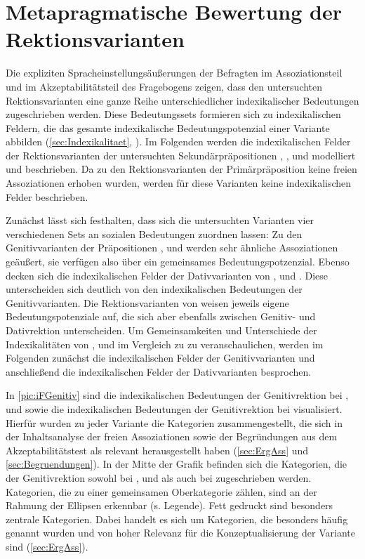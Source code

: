 \section{Metapragmatische Bewertung der Rektionsvarianten}
\label{sec:DiskBewertung}
Die expliziten Spracheinstellungsäußerungen der Befragten im Assoziationsteil und im Akzeptabilitätsteil des Fragebogens zeigen, dass den untersuchten Rektionsvarianten eine ganze Reihe unterschiedlicher indexikalischer Bedeutungen zugeschrieben werden. 
Diese Bedeutungssets formieren sich zu indexikalischen Feldern, die das gesamte indexikalische Bedeutungspotenzial einer Variante abbilden (\autoref{sec:Indexikalitaet}, \citealp[s.][]{Eckert2008}). 
Im Folgenden werden die indexikalischen Felder der Rektionsvarianten der untersuchten Sekundärpräpositionen \wegen, \waehrend{}, \dank{} und \gegenueber{} modelliert und beschrieben.
Da zu den Rektionsvarianten der Primärpräposition  keine freien Assoziationen erhoben wurden, werden für diese Varianten keine indexikalischen Felder beschrieben. 

Zunächst lässt sich festhalten, dass sich die untersuchten Varianten vier verschiedenen Sets an sozialen Bedeutungen zuordnen lassen: 
Zu den Genitivvarianten der Präpositionen \wegen{}, \waehrend{} und \dank{} werden sehr ähnliche Assoziationen geäußert, sie verfügen also über ein gemeinsames Bedeutungspotzenzial. 
Ebenso decken sich die indexikalischen Felder der Dativvarianten von \wegen{}, \waehrend{} und \dank{}.
Diese unterscheiden sich deutlich von den indexikalischen Bedeutungen der Genitivvarianten. 
Die Rektionsvarianten von \gegenueber{} weisen jeweils eigene Bedeutungspotenziale auf, die sich aber ebenfalls zwischen Genitiv- und Dativrektion unterscheiden. 
Um Gemeinsamkeiten und Unterschiede der Indexikalitäten von \wegen, \waehrend{} und \dank{} im Vergleich zu \gegenueber{} zu veranschaulichen, werden im Folgenden zunächst die indexikalischen Felder der Genitivvarianten und anschließend die indexikalischen Felder der Dativvarianten besprochen. 

In \autoref{pic:iFGenitiv} sind die indexikalischen Bedeutungen der Genitivrektion bei \wegen, \waehrend{} und \dank{} sowie die indexikalischen Bedeutungen der Genitivrektion bei \gegenueber{} visualisiert. 
Hierfür wurden zu jeder Variante die Kategorien zusammengestellt, die sich in der Inhaltsanalyse der freien Assoziationen sowie der Begründungen aus dem Akzeptabilitätstest als relevant herausgestellt haben (\autoref{sec:ErgAss} und \autoref{sec:Begruendungen}). 
In der Mitte der Grafik befinden sich die Kategorien, die der Genitivrektion sowohl bei \wegen, \waehrend{} und \dank{} als auch bei \gegenueber{} zugeschrieben werden. 
Kategorien, die zu einer gemeinsamen Oberkategorie zählen, sind an der Rahmung der Ellipsen erkennbar (s. Legende). 
Fett gedruckt sind besonders zentrale Kategorien.
Dabei handelt es sich um Kategorien, die besonders häufig genannt wurden und von hoher Relevanz für die Konzeptualisierung der Variante sind (\autoref{sec:ErgAss}).


